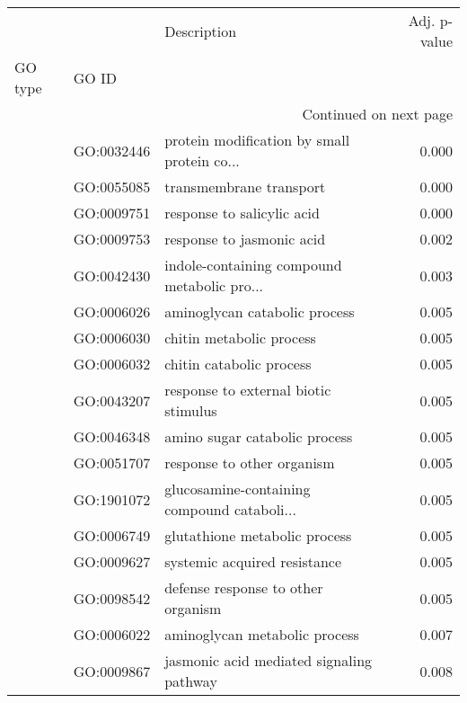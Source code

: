 \begin{longtable}{lllr}
\toprule
   &            &                                  Description &  Adj. p-value \\
GO type & GO ID &                                              &               \\
\midrule
\endhead
\midrule
\multicolumn{4}{r}{{Continued on next page}} \\
\midrule
\endfoot

\bottomrule
\endlastfoot
\multirow{63}{*}{BP} & GO:0032446 &  protein modification by small protein co... &         0.000 \\
   & GO:0055085 &                      transmembrane transport &         0.000 \\
   & GO:0009751 &                   response to salicylic acid &         0.000 \\
   & GO:0009753 &                    response to jasmonic acid &         0.002 \\
   & GO:0042430 &  indole-containing compound metabolic pro... &         0.003 \\
   & GO:0006026 &                aminoglycan catabolic process &         0.005 \\
   & GO:0006030 &                     chitin metabolic process &         0.005 \\
   & GO:0006032 &                     chitin catabolic process &         0.005 \\
   & GO:0043207 &         response to external biotic stimulus &         0.005 \\
   & GO:0046348 &                amino sugar catabolic process &         0.005 \\
   & GO:0051707 &                   response to other organism &         0.005 \\
   & GO:1901072 &  glucosamine-containing compound cataboli... &         0.005 \\
   & GO:0006749 &                glutathione metabolic process &         0.005 \\
   & GO:0009627 &                 systemic acquired resistance &         0.005 \\
   & GO:0098542 &           defense response to other organism &         0.005 \\
   & GO:0006022 &                aminoglycan metabolic process &         0.007 \\
   & GO:0009867 &     jasmonic acid mediated signaling pathway &         0.008 \\

\end{longtable}
